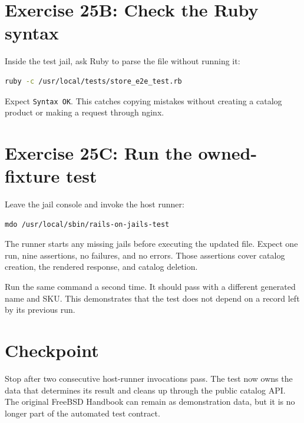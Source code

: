 \section{Exercise 25B: Check the Ruby syntax}

Inside the test jail, ask Ruby to parse the file without running it:

\begin{lstlisting}[language=sh]
ruby -c /usr/local/tests/store_e2e_test.rb
\end{lstlisting}

Expect \texttt{Syntax OK}. This catches copying mistakes without creating a
catalog product or making a request through nginx.

\section{Exercise 25C: Run the owned-fixture test}

Leave the jail console and invoke the host runner:

\begin{lstlisting}[language=sh]
mdo /usr/local/sbin/rails-on-jails-test
\end{lstlisting}

The runner starts any missing jails before executing the updated file. Expect
one run, nine assertions, no failures, and no errors. Those assertions cover
catalog creation, the rendered response, and catalog deletion.

Run the same command a second time. It should pass with a different generated
name and SKU. This demonstrates that the test does not depend on a record left
by its previous run.

\section{Checkpoint}

Stop after two consecutive host-runner invocations pass. The test now owns the
data that determines its result and cleans up through the public catalog API.
The original FreeBSD Handbook can remain as demonstration data, but it is no
longer part of the automated test contract.
